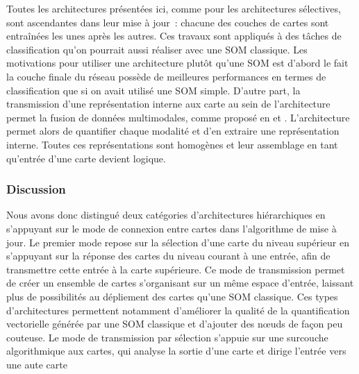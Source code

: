 \documentclass[../main]{subfiles}
\begin{document}
Toutes les architectures présentées ici, comme pour les architectures sélectives, sont ascendantes dans leur mise à jour~: chacune des couches de cartes sont entraînées les unes après les autres. 
Ces travaux sont appliqués à des tâches de classification qu'on pourrait aussi réaliser avec une SOM classique.
Les motivations pour utiliser une architecture plutôt qu'une SOM est d'abord le fait la couche finale du réseau possède de meilleures performances en termes de classification que si on avait utilisé une SOM simple.
D'autre part, la transmission d'une représentation interne aux carte au sein de l'architecture permet la fusion de données multimodales, comme proposé en \cite{mici_self-organizing_2018} et \cite{nawaratne_hierarchical_2020-1}. L'architecture permet alors de quantifier chaque modalité et d'en extraire une représentation interne. Toutes ces représentations sont homogènes et leur assemblage en tant qu'entrée d'une carte devient logique.


\subsubsection{Discussion}

Nous avons donc distingué deux catégories d'architectures hiérarchiques en s'appuyant sur le mode de connexion entre cartes dans l'algorithme de mise à jour. 
Le premier mode repose sur la sélection d'une carte du niveau supérieur en s'appuyant sur la réponse des cartes du niveau courant à une entrée, afin de transmettre cette entrée à la carte supérieure. Ce mode de transmission permet de créer un ensemble de cartes s'organisant sur un même espace d'entrée, laissant plus de possibilités au dépliement des cartes qu'une SOM classique. Ces types d'architectures permettent notamment d'améliorer la qualité de la quantification vectorielle générée par une SOM classique et d'ajouter des n\oe{}uds de façon peu couteuse. Le mode de transmission par sélection s'appuie sur une surcouche algorithmique aux cartes, qui analyse la sortie d'une carte et dirige l'entrée vers une aute carte
\end{document}

